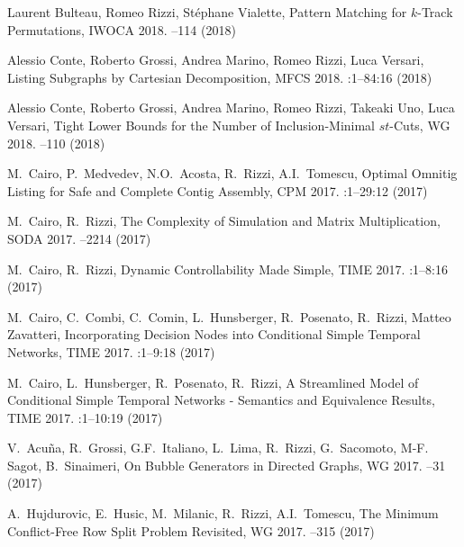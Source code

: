 
\begin{etaremune}
  \item {\sc Laurent Bulteau, Romeo Rizzi, Stéphane Vialette},
   \newblock Pattern Matching for $k$-Track Permutations,
   \newblock IWOCA 2018.
   --114 (2018)

  \item {\sc Alessio Conte, Roberto Grossi, Andrea Marino, Romeo Rizzi, Luca Versari},
   \newblock Listing Subgraphs by Cartesian Decomposition,
   \newblock MFCS 2018.
   :1--84:16 (2018)

  \item {\sc Alessio Conte, Roberto Grossi, Andrea Marino, Romeo Rizzi, Takeaki Uno, Luca Versari},
   \newblock Tight Lower Bounds for the Number of Inclusion-Minimal $st$-Cuts,
   \newblock WG 2018.
   --110 (2018)
   
  \item {\sc M.~Cairo, P.~Medvedev, N.O.~Acosta, R.~Rizzi, A.I.~Tomescu},
   \newblock Optimal Omnitig Listing for Safe and Complete Contig Assembly,
   \newblock CPM 2017.
   :1--29:12 (2017)

  \item {\sc M.~Cairo, R.~Rizzi},
   \newblock The Complexity of Simulation and Matrix Multiplication,
   \newblock SODA 2017.
   --2214 (2017)

  \item {\sc M.~Cairo, R.~Rizzi},
   \newblock Dynamic Controllability Made Simple,
   \newblock TIME 2017.
   :1--8:16 (2017)

  \item {\sc M.~Cairo, C.~Combi, C.~Comin, L.~Hunsberger, R.~Posenato, R.~Rizzi, Matteo Zavatteri},
   \newblock Incorporating Decision Nodes into Conditional Simple Temporal Networks,
   \newblock TIME 2017.
   :1--9:18 (2017)

  \item {\sc M.~Cairo, L.~Hunsberger, R.~Posenato, R.~Rizzi},
   \newblock A Streamlined Model of Conditional Simple Temporal Networks - Semantics and Equivalence Results,
   \newblock TIME 2017.
   :1--10:19 (2017)

  \item {\sc V.~Acu\~na, R.~Grossi, G.F.~Italiano, L.~Lima, R.~Rizzi, G.~Sacomoto, M-F. Sagot, B.~Sinaimeri},
   \newblock On Bubble Generators in Directed Graphs,
   \newblock  WG 2017.
   --31 (2017)

  \item {\sc A.~Hujdurovic, E.~Husic, M.~Milanic, R.~Rizzi, A.I.~Tomescu},
   \newblock The Minimum Conflict-Free Row Split Problem Revisited,
   \newblock  WG 2017.
   --315 (2017)


\end{etaremune}
